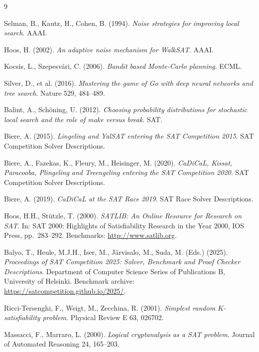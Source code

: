 \documentclass[11pt]{article}
\begin{document}
\begin{thebibliography}{9}

Selman, B., Kautz, H., Cohen, B. (1994). \emph{Noise strategies for
improving local search}. AAAI.

Hoos, H. (2002). \emph{An adaptive noise mechanism for WalkSAT}. AAAI.

Kocsis, L., Szepesv\'ari, C. (2006). \emph{Bandit based Monte-Carlo
planning}. ECML.

Silver, D., et al. (2016). \emph{Mastering the game of Go with deep
neural networks and tree search}. Nature 529, 484--489.

Balint, A., Sch\"oning, U. (2012). \emph{Choosing probability
distributions for stochastic local search and the role of make
versus break}. SAT.

Biere, A. (2015). \emph{Lingeling and YalSAT entering the SAT
Competition 2015}. SAT Competition Solver Descriptions.

Biere, A., Fazekas, K., Fleury, M., Heisinger, M. (2020).
\emph{CaDiCaL, Kissat, Paracooba, Plingeling and Treengeling
entering the SAT Competition 2020}. SAT Competition Solver
Descriptions.

Biere, A. (2019). \emph{CaDiCaL at the SAT Race 2019}. SAT Race
Solver Descriptions.

Hoos, H.H., St\"utzle, T. (2000). \emph{SATLIB: An Online Resource
for Research on SAT}. In: SAT 2000: Highlights of Satisfiability
Research in the Year 2000, IOS Press, pp.~283--292. Benchmarks:
\url{http://www.satlib.org}.

Balyo, T., Heule, M.J.H., Iser, M., J\"arvisalo, M., Suda, M. (Eds.)
(2025). \emph{Proceedings of SAT Competition 2025: Solver, Benchmark
and Proof Checker Descriptions}. Department of Computer Science
Series of Publications B, University of Helsinki. Benchmark archive:
\url{https://satcompetition.github.io/2025/}.

Ricci-Tersenghi, F., Weigt, M., Zecchina, R. (2001). \emph{Simplest
random $K$-satisfiability problem}. Physical Review E 63, 026702.

Massacci, F., Marraro, L. (2000). \emph{Logical cryptanalysis as a
SAT problem}. Journal of Automated Reasoning 24, 165--203.

\end{thebibliography}
\end{document}
